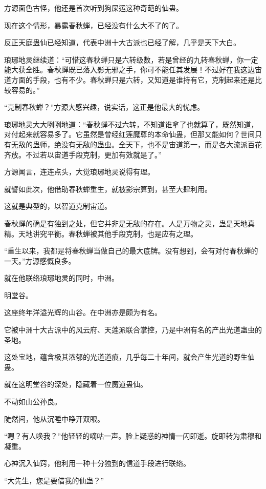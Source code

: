 
\begin{this_body}

方源面色古怪，他还是首次听到狗屎运这种奇葩的仙蛊。

现在这个情形，暴露春秋蝉，已经没有什么大不了的了。

反正天庭蛊仙已经知道，代表中洲十大古派也已经了解，几乎是天下大白。

琅琊地灵继续道：“可惜这春秋蝉只是六转级数，若是曾经的九转春秋蝉，你一定能大获全胜。春秋蝉既已落入影无邪之手，你可不能任其发展！不过好在我这边宙道方面的手段，也有不少。春秋蝉只是六转，又知道是谁持有它，克制起来还是比较容易的。”

“克制春秋蝉？”方源大感兴趣，说实话，这正是他最大的忧虑。

琅琊地灵大大咧咧地道：“春秋蝉不过六转，不知道谁拿了也就算了，既然知道，对付起来就容易多了。它虽然是曾经红莲魔尊的本命仙蛊，但那又能如何？世间只有无敌的蛊师，绝没有无敌的蛊虫。全天下，也不是宙道第一，而是各大流派百花齐放。不过若以宙道手段克制，更加有效就是了。”

方源闻言，连连点头，大觉琅琊地灵说得有理。

就譬如此次，他借助春秋蝉重生，就被影宗算到，甚至大肆利用。

这就是典型的，以智道克制宙道。

春秋蝉的确是有独到之处，但它并非是无敌的存在。人是万物之灵，蛊是天地真精。天地讲究平衡。春秋蝉被其他手段克制，也是应有之理。

“重生以来，我都是将春秋蝉当做自己的最大底牌。没有想到，会有对付春秋蝉的一天。”方源感慨良多。

就在他联络琅琊地灵的同时，中洲。

明堂谷。

这座终年洋溢光辉的山谷。在中洲亦是颇为有名。

它被中洲十大古派中的风云府、天莲派联合掌控，乃是中洲有名的产出光道蛊虫的圣地。

这处宝地，蕴含极其浓郁的光道道痕，几乎每二十年间，就会产生光道的野生仙蛊。

就在这明堂谷的深处，隐藏着一位魔道蛊仙。

不动如山公孙良。

陡然间，他从沉睡中睁开双眼。

“嗯？有人唤我？”他轻轻的嘀咕一声。脸上疑惑的神情一闪即逝。旋即转为肃穆和凝重。

心神沉入仙窍，他利用一种十分独到的信道手段进行联络。

“大先生，您是要借我的仙蛊？”


\end{this_body}
